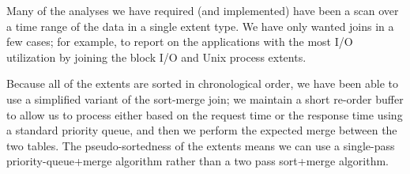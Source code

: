 Many of the analyses we have required (and implemented)
have been a scan
over a time range of the data in a single extent type.  We have only
wanted joins in a few cases; for example,
to report on the applications with
the most I/O utilization by joining the block I/O and Unix process
extents.

Because all of the extents are sorted in chronological order, we have been able
to use a simplified variant of the sort-merge join; we maintain a
short re-order buffer to allow us to process either based on the
request time or the response time using a standard priority queue, and
then we perform the expected merge between the two tables.  The
pseudo-sortedness of the extents means we can use a single-pass
priority-queue+merge algorithm rather than a two pass
\linebreak[4] sort+merge algorithm.

